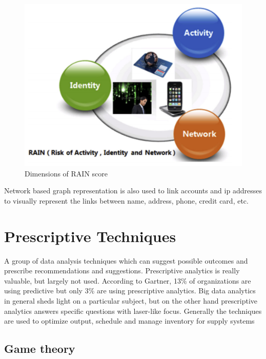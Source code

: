 \begin{figure}[H]
	\includegraphics[scale = 0.8]{figures/RAIN_dimension.png}
	\centering
	\caption{Dimensions of RAIN score}
	\label{fig:rain_dimension}
\end{figure}

Network based graph representation is also used to link accounts and ip addresses to visually represent the links between name, address, phone, credit card, etc.

\chapter{Prescriptive Techniques}
\label{prescriptive-techniques}

A group of data analysis techniques which can suggest possible outcomes and prescribe recommendations and suggestions.
Prescriptive analytics is really valuable, but largely not used. According to Gartner, 13\% of organizations are using predictive but only 3\% are using prescriptive analytics. 
Big data analytics in general sheds light on a particular subject, but on the other hand prescriptive analytics answers specific questions with laser-like focus. 
Generally the techniques are used to optimize output, schedule and manage inventory for supply systems

\section{Game theory}

%
%
%
%

\setlength{\footskip}{8mm}

